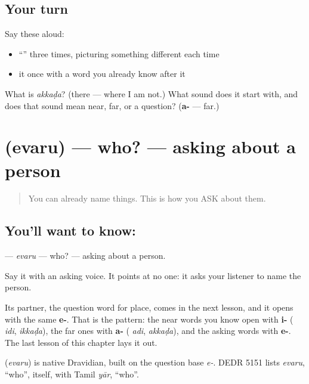 \subsection*{Your turn}
Say these aloud:

\begin{itemize}
\raggedright
  \item \textquotedblleft{}\textquotedblright{} three times, picturing something different each time
  \item it once with a word you already know after it
\end{itemize}

\begin{tcolorbox}[breakable,colback=teal!4,colframe=teal!35!black,title={Before you move on}]
What is \emph{akkaḍa}? (there — where I am not.) What sound does it start with, and does that sound mean near, far, or a question? (\textbf{a-} — far.)
\end{tcolorbox}
\section[\texorpdfstring{\te{ఎవరు} (evaru)}{ఎవరు (evaru)}]{ (evaru) — who? — asking about a person}

\label{lesson:TE-C41-who}



\begin{quote}
You can already name things. This is how you ASK about them.
\end{quote}

\subsection*{You'll want to know: }
\textbf{} — \emph{evaru} — who? — asking about a person.

Say it with an asking voice. It points at no one: it asks your listener to name the person.

Its partner, the question word for place, comes in the next lesson, and it opens with the same \textbf{e-}. That is the pattern: the near words you know open with \textbf{i-} (\textbf{} \emph{idi}, \textbf{} \emph{ikkaḍa}), the far ones with \textbf{a-} (\textbf{} \emph{adi}, \textbf{} \emph{akkaḍa}), and the asking words with \textbf{e-}. The last lesson of this chapter lays it out.

\begin{cousinweb}
\textbf{} (\emph{evaru}) is native Dravidian, built on the question base \emph{e-}. DEDR 5151 lists \emph{evaru}, \textquotedblleft{}who\textquotedblright{}, itself, with Tamil \emph{yār}, \textquotedblleft{}who\textquotedblright{}.
\end{cousinweb}


